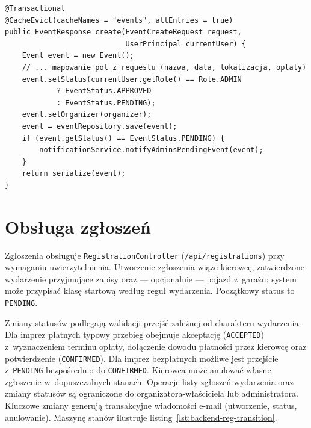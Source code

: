 \documentclass{sprz}
\begin{document}
\begin{lstlisting}[caption={Tworzenie wydarzenia --- status zależny od roli},label={lst:backend-event-create}]
@Transactional
@CacheEvict(cacheNames = "events", allEntries = true)
public EventResponse create(EventCreateRequest request,
                            UserPrincipal currentUser) {
    Event event = new Event();
    // ... mapowanie pol z requestu (nazwa, data, lokalizacja, oplaty)
    event.setStatus(currentUser.getRole() == Role.ADMIN
            ? EventStatus.APPROVED
            : EventStatus.PENDING);
    event.setOrganizer(organizer);
    event = eventRepository.save(event);
    if (event.getStatus() == EventStatus.PENDING) {
        notificationService.notifyAdminsPendingEvent(event);
    }
    return serialize(event);
}
\end{lstlisting}

\section{Obsługa zgłoszeń}
Zgłoszenia obsługuje \texttt{RegistrationController} (\texttt{/api/registrations}) przy wymaganiu uwierzytelnienia. Utworzenie zgłoszenia wiąże kierowcę, zatwierdzone wydarzenie przyjmujące zapisy oraz --- opcjonalnie --- pojazd z~garażu; system może przypisać klasę startową według reguł wydarzenia. Początkowy status to \texttt{PENDING}.

Zmiany statusów podlegają walidacji przejść zależnej od charakteru wydarzenia. Dla imprez płatnych typowy przebieg obejmuje akceptację (\texttt{ACCEPTED}) z~wyznaczeniem terminu opłaty, dołączenie dowodu płatności przez kierowcę oraz potwierdzenie (\texttt{CONFIRMED}). Dla imprez bezpłatnych możliwe jest przejście z~\texttt{PENDING} bezpośrednio do \texttt{CONFIRMED}. Kierowca może anulować własne zgłoszenie w~dopuszczalnych stanach. Operacje listy zgłoszeń wydarzenia oraz zmiany statusów są ograniczone do organizatora-właściciela lub administratora. Kluczowe zmiany generują transakcyjne wiadomości e-mail (utworzenie, status, anulowanie). Maszynę stanów ilustruje listing~\ref{lst:backend-reg-transition}.
\end{document}

